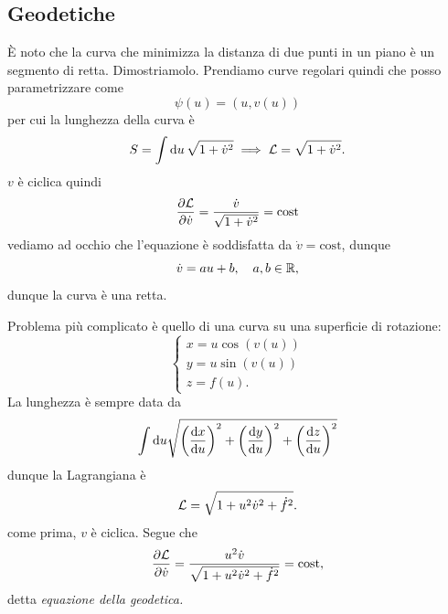     \subsection{Geodetiche}
    È noto che la curva che minimizza la distanza di due punti in un piano è un segmento di retta. Dimostriamolo. Prendiamo curve regolari quindi che posso parametrizzare come
    \begin{equation}
        \psi(u) = (u,v(u))
    \end{equation}
    per cui la lunghezza della curva è 
    \begin{equation}
        S = \int \mathrm{d} u\, \sqrt{1+\dot{v}^2} \implies \mathcal{L} =\sqrt{1+\dot{v}^2}. 
    \end{equation}
    $v$ è ciclica quindi
    \begin{equation}
        \frac{\partial \mathcal{L}}{\partial \dot{v}} = \frac{\dot{v}}{\sqrt{1+\dot{v}^2}}=\mathrm{cost}
    \end{equation}
    vediamo ad occhio che l'equazione è soddisfatta da $\dot{v}=\mathrm{cost}$, dunque
    \begin{equation}
        \dot{v} = au+b,\quad a,b\in\mathbb{R},
    \end{equation}
    dunque la curva è una retta. 

    Problema più complicato è quello di una curva su una superficie di rotazione:
    \begin{equation}
        \begin{cases}
            x = u\cos(v(u))\\
            y = u \sin(v(u))\\
            z = f(u).
        \end{cases}
    \end{equation}
    La lunghezza è sempre data da
    \begin{equation}
        \int \mathrm{d} u \sqrt{\left(\frac{\mathrm{d} x}{\mathrm{d} u}\right)^2+\left(\frac{\mathrm{d} y}{\mathrm{d} u}\right)^2+\left(\frac{\mathrm{d} z}{\mathrm{d} u}\right)^2}
    \end{equation}
    dunque la Lagrangiana è
    \begin{equation}
        \mathcal{L} = \sqrt{1+u^2\dot{v}^2+\dot{f}^2}.
    \end{equation}
    come prima, $v$ è ciclica. Segue che
    \begin{equation}
        \frac{\partial \mathcal{L}}{\partial \dot{v}} = \frac{u^2\dot{v}}{\sqrt{1+u^2\dot{v}^2+\dot{f}^2}}=\mathrm{cost},
    \end{equation}
    detta \emph{equazione della geodetica.}